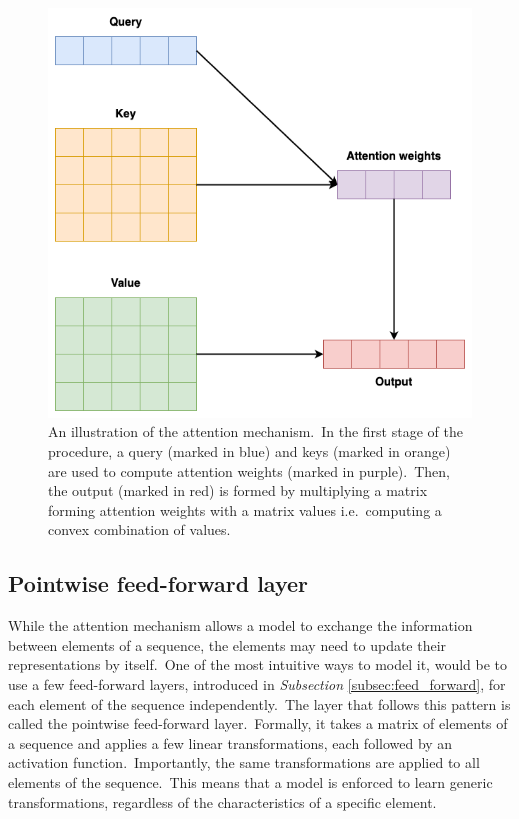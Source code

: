 \documentclass[longabstract, english, mgr]{iithesis}
\theoremstyle{default_theorem_style}\newtheorem{theorem}{Theorem}
\theoremstyle{default_theorem_style}\newtheorem{definition}{Definition}
\begin{document}
\begin{figure}[t]
\centering
\includegraphics[scale=0.4]{attention}
\caption{An illustration of the attention mechanism.\ In the first stage of the procedure, a query (marked in blue) and
keys (marked in orange) are used to compute attention weights (marked in purple).\ Then, the output (marked in red) is
formed by multiplying a matrix forming attention weights with a matrix values i.e.\ computing a convex combination of
values.}
\label{fig:attention}
\end{figure}

\subsection{Pointwise feed-forward layer}

While the attention mechanism allows a model to exchange the information between elements of a sequence, the elements
may need to update their representations by itself.\ One of the most intuitive ways to model it, would be to use a few
feed-forward layers, introduced in \textit{Subsection} \ref{subsec:feed_forward}, for each element of the sequence
independently.\ The layer that follows this pattern is called the pointwise feed-forward layer.\ Formally, it takes
a matrix of elements of a sequence and applies a few linear transformations, each followed by an activation
function.\ Importantly, the same transformations are applied to all elements of the sequence.\ This means that a
model is enforced to learn generic transformations, regardless of the characteristics of a specific element.
\end{document}
